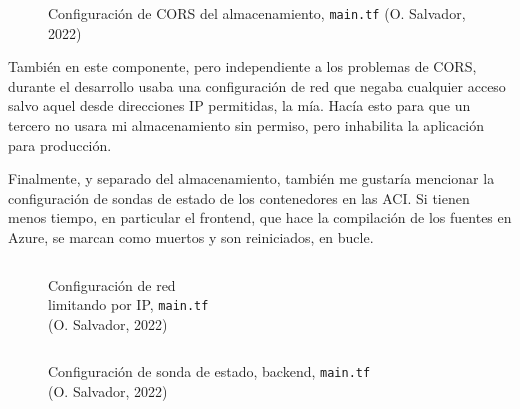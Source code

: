 \documentclass[11pt]{article}
\begin{document}
\begin{flushleft}
		\begin{figure}[htb]
			\centering
			\begin{subfigure}{.9\linewidth}
				\inputminted[fontsize=\scriptsize, firstline=14, lastline=14, linenos, frame=single, breaklines]{javascript}{../../terraform/main.tf}
				\vspace{-.4cm}
				\inputminted[fontsize=\scriptsize, firstline=26, lastline=26, linenos, frame=single, breaklines]{javascript}{../../terraform/main.tf}%
                \vspace{-.4cm}
				\inputminted[fontsize=\scriptsize, firstline=34, lastline=42, linenos, frame=single, breaklines]{javascript}{../../terraform/main.tf}
			\end{subfigure}
			\caption{Configuración de CORS del almacenamiento, \texttt{main.tf} (O. Salvador, 2022)}
		\end{figure}
		
	También en este componente, pero independiente a los problemas de CORS, durante el desarrollo usaba una configuración de red que negaba cualquier acceso salvo aquel desde direcciones IP permitidas, la mía. Hacía esto para que un tercero no usara mi almacenamiento sin permiso, pero inhabilita la aplicación para producción.
	\linebreak
	
	Finalmente, y separado del almacenamiento, también me gustaría mencionar la configuración de sondas de estado de los contenedores en las ACI. Si tienen menos tiempo, en particular el frontend, que hace la compilación de los fuentes en Azure, se marcan como muertos y son reiniciados, en bucle.
	\linebreak
	
		\begin{figure}[htb]
			\centering
			\begin{minipage}{.35\linewidth}
				\inputminted[fontsize=\scriptsize, firstline=21, lastline=24, linenos, frame=single, breaklines]{dockerfile}{../../terraform/main.tf}
				\vspace{3.6cm}
				\caption{Configuración de red \\limitando por IP, \texttt{main.tf} \\(O. Salvador, 2022)}
			\end{minipage}
			\hspace{2cm}
			\begin{minipage}{.35\linewidth}
				\inputminted[fontsize=\scriptsize, firstline=67, lastline=77, linenos, frame=single, breaklines]{dockerfile}{../../backend/terraform/main.tf}
				\caption{Configuración de sonda de estado, backend, \texttt{main.tf} \\(O. Salvador, 2022)}
			\end{minipage}
		\end{figure} 
		

\end{flushleft}
\end{document}
